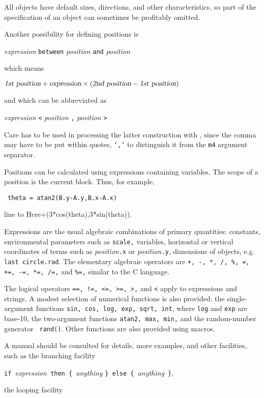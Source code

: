 All objects have default sizes, directions, and other characteristics,
so part of the specification of an object can sometimes be profitably
omitted.

Another possibility for defining positions is 

{\sl expression} {\tt between} {\sl position}
 {\tt and} {\sl position}

\noindent%
which means 

$\hbox{\sl 1st position} + \hbox{\sl expression} \times 
  (\hbox{\sl 2nd position} - \hbox{\sl 1st position})$

\noindent and which can be abbreviated as

{\sl expression} {\tt <} {\sl position} {\tt ,} {\sl position} {\tt >}

\noindent%
Care has to be used in processing the latter construction with \Mfour,
since the comma may have to be put within quotes, {\tt `,'}
to distinguish it from the {\tt m4} argument separator.

Positions can be calculated using expressions containing variables.
The scope of a position is the current block.  Thus, for example,

{\tt
  theta = atan2(B.y-A.y,B.x-A.x)

  line to Here+(3*cos(theta),3*sin(theta)).
  }

Expressions are the usual algebraic combinations of primary quantities:
constants, environmental parameters such as {\tt scale,} variables,
horizontal or vertical coordinates of terms such as
{\sl position}{\tt.x} or {\sl position}{\tt.y},
dimensions of \pic objects, e.g. {\tt last circle.rad}.
The elementary algebraic operators are
{\tt +, -, *, /, \%, =, +=, -=, *=, /=,} and {\tt \%=,}
similar to the C language.

The logical operators {\tt ==, !=, <=, >=, >,} and {\tt <} apply to
expressions and strings.  A modest selection of numerical functions is
also provided: the single-argument functions {\tt sin, cos, log, exp,
sqrt, int}, where {\tt log} and {\tt exp} are base-10, the two-argument
functions {\tt atan2, max, min,} and the random-number generator {\tt
rand()}.  Other functions are also provided using macros.

A \pic manual should be consulted for details, more examples, and
other facilities, such as the branching facility

\verb|if |{\sl expression}\verb| then { |{\sl anything} 
  \verb|} else { |{\sl anything}\verb| }|,

\noindent%
the looping facility

